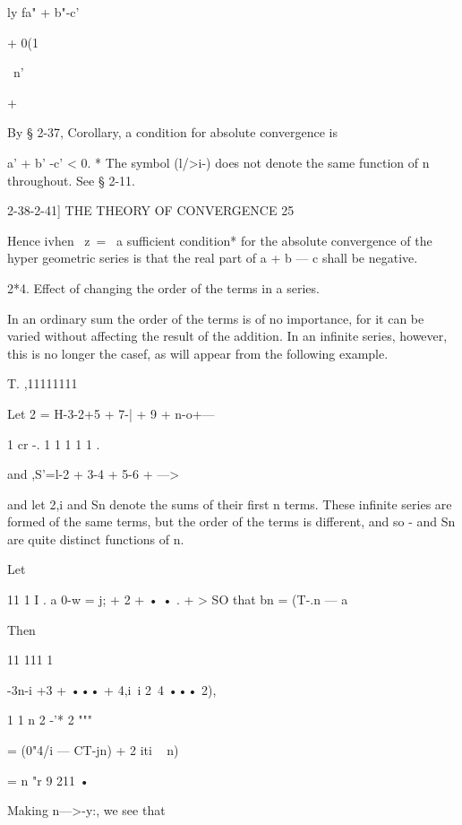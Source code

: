 ly fa" + b"-c'



+ 0(1

\ n'

+



  






By § 2-37, Corollary, a condition for absolute convergence is

a' + b' -c' < 0. * The symbol (l/>i-) does not denote the same
function of n throughout. See § 2-11.



2-38-2-41] THE THEORY OF CONVERGENCE 25

Hence ivhen \ z\ = \, a sufficient condition* for the absolute
convergence of the hyper geometric series is that the real part of a +
b — c shall be negative.

2*4. Effect of changing the order of the terms in a series.

In an ordinary sum the order of the terms is of no importance, for it
can be varied without affecting the result of the addition. In an
infinite series, however, this is no longer the casef, as will appear
from the following example.

T. ,11111111

Let 2 = H-3-2+5 + 7-| + 9 + n-o+---

1 cr -. 1 1 1 1 1 .

and ,S'=l-2 + 3-4 + 5-6 + --->

and let 2,i and Sn denote the sums of their first n terms. These
infinite series are formed of the same terms, but the order of the
terms is different, and so - and Sn are quite distinct functions of n.



Let


11 1 I . a 0-w = j; + 2 + • • . + > SO that bn = (T-.n — a


Then


 11 111 1

-3n-i +3 + ••• + 4,i\ i 2~4 ••• 2),




1 1 n 2 -'* 2 """




= (0"4/i — CT-jn) + 2 iti ~ n)




= n "r 9 211 •



Making n—>-y:, we see that

